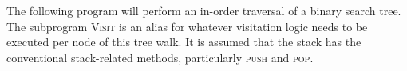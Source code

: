 The following program will perform an in-order traversal of a binary search tree. The subprogram \textsc{Visit} is an alias for whatever visitation logic needs to be executed per node of this tree walk. It is assumed that the stack has the conventional stack-related methods, particularly \textsc{push} and \textsc{pop}.
